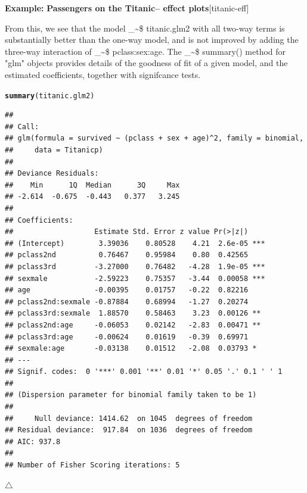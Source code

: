 \documentclass{article}
\makeatletter
\newcommand{\hlstd}[1]{\textcolor[rgb]{0.345,0.345,0.345}{#1}}%
\newcommand{\hlkwd}[1]{\textcolor[rgb]{0.737,0.353,0.396}{\textbf{#1}}}%
\newenvironment{kframe}{%
 \def\at@end@of@kframe{}%
 \ifinner\ifhmode%
  \def\at@end@of@kframe{\end{minipage}}%
  \begin{minipage}{\columnwidth}%
 \fi\fi%
 \def\FrameCommand##1{\hskip\@totalleftmargin \hskip-\fboxsep
 \colorbox{shadecolor}{##1}\hskip-\fboxsep
     \hskip-\linewidth \hskip-\@totalleftmargin \hskip\columnwidth}%
 \MakeFramed {\advance\hsize-\width
   \@totalleftmargin\z@ \linewidth\hsize
   \@setminipage}}%
 {\par\unskip\endMakeFramed%
 \at@end@of@kframe}
\newenvironment{knitrout}{}{} %
\newcommand{\class}[1]{\textsf{"#1"}}
\newcommand\code{\bgroup\@makeother\_\@makeother\~\@makeother\$\@codex}
\def\@codex#1{{\normalfont\ttfamily\hyphenchar\font=-1 #1}\egroup}
\newcommand{\func}[1]{\code{#1()}}
\newenvironment{Example}[2][unnamed-example]%
  {\medskip\noindent\textbf{\textsf{Example:}}
   \textbf{#2}\hfill [#1]\par\smallskip
  }
  {\hfill $\triangle$}
\makeatother
\begin{document}
\begin{Example}[titanic-eff]{Passengers on the Titanic-- effect plots}
From this, we see that the model \code{titanic.glm2} with all two-way terms is
substantially better than the one-way model, and is not improved by adding the
three-way interaction of \code{pclass:sex:age}.  The \func{summary} method for
\class{glm} objects provides details of the goodness of fit of a given model,
and the estimated coefficients, together with signifcance tests.
\begin{knitrout}
\color{fgcolor}\begin{kframe}
\begin{alltt}
\hlkwd{summary}\hlstd{(titanic.glm2)}
\end{alltt}
\begin{verbatim}
## 
## Call:
## glm(formula = survived ~ (pclass + sex + age)^2, family = binomial, 
##     data = Titanicp)
## 
## Deviance Residuals: 
##    Min      1Q  Median      3Q     Max  
## -2.614  -0.675  -0.443   0.377   3.245  
## 
## Coefficients:
##                   Estimate Std. Error z value Pr(>|z|)    
## (Intercept)        3.39036    0.80528    4.21  2.6e-05 ***
## pclass2nd          0.76467    0.95984    0.80  0.42565    
## pclass3rd         -3.27000    0.76482   -4.28  1.9e-05 ***
## sexmale           -2.59223    0.75357   -3.44  0.00058 ***
## age               -0.00395    0.01757   -0.22  0.82216    
## pclass2nd:sexmale -0.87884    0.68994   -1.27  0.20274    
## pclass3rd:sexmale  1.88570    0.58463    3.23  0.00126 ** 
## pclass2nd:age     -0.06053    0.02142   -2.83  0.00471 ** 
## pclass3rd:age     -0.00624    0.01619   -0.39  0.69971    
## sexmale:age       -0.03138    0.01512   -2.08  0.03793 *  
## ---
## Signif. codes:  0 '***' 0.001 '**' 0.01 '*' 0.05 '.' 0.1 ' ' 1
## 
## (Dispersion parameter for binomial family taken to be 1)
## 
##     Null deviance: 1414.62  on 1045  degrees of freedom
## Residual deviance:  917.84  on 1036  degrees of freedom
## AIC: 937.8
## 
## Number of Fisher Scoring iterations: 5
\end{verbatim}
\end{kframe}
\end{knitrout}


\end{Example}
\end{document}
